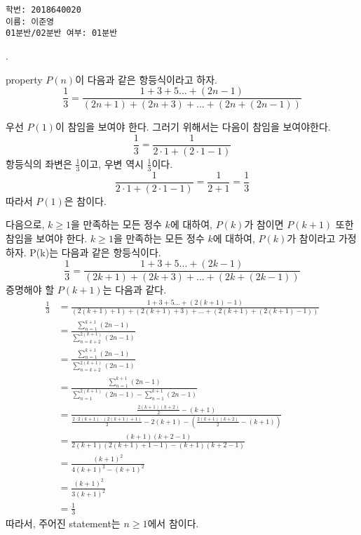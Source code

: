 \documentclass{article}
\begin{document}
\begin{verbatim}
학번: 2018640020
이름: 이준영
01분반/02분반 여부: 01분반
\end{verbatim}
. 
\begin{addmargin}[1em]{2em}
property $P(n)$이 다음과 같은 항등식이라고 하자. 
\[\frac{1}{3} = \frac{1+3+5...+(2n-1)}{(2n+1)+(2n+3)+...+(2n+(2n-1))}\]

우선 $P(1)$이 참임을 보여야 한다. 그러기 위해서는 다음이 참임을 보여야한다.
\[\frac{1}{3} = \frac{1}{2\cdot 1 + (2\cdot 1 - 1)}\]
항등식의 좌변은 $\frac{1}{3}$이고, 우변 역시 $\frac{1}{3}$이다.
\[\frac{1}{2\cdot 1 + (2\cdot 1 - 1)} = \frac{1}{2 + 1} = \frac{1}{3}\] 
따라서 $P(1)$은 참이다.
\newline

다음으로, $k\ge 1$을 만족하는 모든 정수 $k$에 대하여, $P(k)$가 참이면 $P(k+1)$ 또한 참임을 보여야 한다. 
$k\ge 1$을 만족하는 모든 정수 $k$에 대하여, $P(k)$가 참이라고 가정하자. P(k)는 다음과 같은 항등식이다.
\[\frac{1}{3} = \frac{1+3+5...+(2k-1)}{(2k+1)+(2k+3)+...+(2k+(2k-1))}\]
증명해야 할 $P(k+1)$는 다음과 같다.
\begin{align*}
\frac{1}{3} &= \frac{1+3+5...+(2(k+1)-1)}{(2(k+1)+1)+(2(k+1)+3)+...+(2(k+1)+(2(k+1)-1))} \\
&= \frac{\sum_{n=1}^{k+1}(2n-1)}{\sum_{n=k+2}^{2(k+1)}(2n-1)} \\
&= \frac{\sum_{n=1}^{k+1}(2n-1)}{\sum_{n=k+2}^{2(k+1)}(2n-1)} \\ 
&= \frac{\sum_{n=1}^{k+1}(2n-1)}{\sum_{n=1}^{2(k+1)}(2n-1) - \sum_{n=1}^{k+1}(2n-1)} \\
&= \frac{\frac{2(k+1)(k+2)}{2} - (k+1)}{\frac{2\cdot 2(k+1)\cdot (2(k+1)+1)}{2} - 2(k+1) - (\frac{2(k+1)(k+2)}{2} - (k+1))} \\
&= \frac{(k+1)(k+2-1)}{2(k+1)(2(k+1)+1 - 1)-(k+1)(k+2-1)} \\
&= \frac{(k+1)^2}{4(k+1)^2-(k+1)^2} \\
&= \frac{(k+1)^2}{3(k+1)^2} \\
&= \frac{1}{3}
\end{align*}
따라서, 주어진 statement는 $n\ge 1$에서 참이다. 
\end{addmargin}
\bigskip
\end{document}
